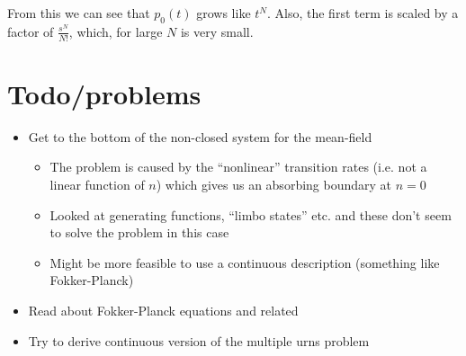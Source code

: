 \documentclass[a4paper,11pt]{article}
\numberwithin{equation}{section}
\begin{document}
From this we can see that \(p_0(t)\) grows like \(t^N\). Also, the first term is
scaled by a factor of \(\frac{s^N}{N!}\), which, for large \(N\) is very small.

\section{Todo/problems}
\begin{itemize}
    \item Get to the bottom of the non-closed system for the mean-field
        \begin{itemize}
            \item The problem is caused by the ``nonlinear'' transition rates
                (i.e. not a linear function of \(n\)) which gives us an
                absorbing boundary at \(n=0\)
            \item Looked at generating functions, ``limbo states'' etc. and
                these don't seem to solve the problem in this case
            \item Might be more feasible to use a continuous description
                (something like Fokker-Planck)
        \end{itemize}
    \item Read about Fokker-Planck equations and related
    \item Try to derive continuous version of the multiple urns problem
\end{itemize}



\end{document}
